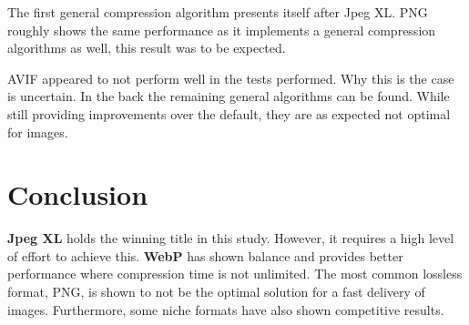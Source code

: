 \documentclass[11pt,a4paper]{report}
\begin{document}
The first general compression algorithm presents itself after Jpeg XL. PNG roughly shows the same performance as it implements a general compression algorithms as well, this result was to be expected.

AVIF appeared to not perform well in the tests performed. Why this is the case is uncertain. In the back the remaining general algorithms can be found. While still providing improvements over the default, they are as expected not optimal for images.

\newpage
\section{Conclusion}

\textbf{Jpeg XL} holds the winning title in this study. However, it requires a high level of effort to achieve this. \textbf{WebP} has shown balance and provides better performance where compression time is not unlimited. The most common lossless format, PNG, is shown to not be the optimal solution for a fast delivery of images. Furthermore, some niche formats have also shown competitive results.

\newpage
{}
\end{document}
